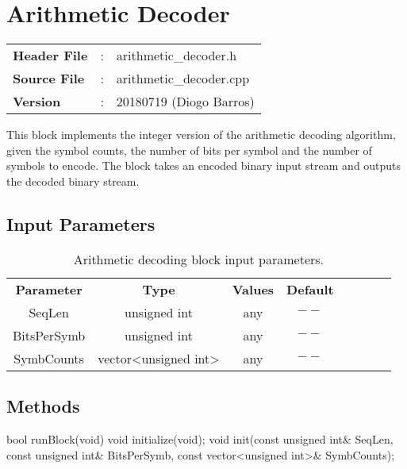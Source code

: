 \clearpage

\section{Arithmetic Decoder}

\begin{tcolorbox}	
	\begin{tabular}{p{2.75cm} p{0.2cm} p{10.5cm}} 	
		\textbf{Header File}   &:& arithmetic\_decoder.h \\
		\textbf{Source File}   &:& arithmetic\_decoder.cpp \\
        \textbf{Version}       &:& 20180719 (Diogo Barros) \\
	\end{tabular}
\end{tcolorbox}

This block implements the integer version of the arithmetic decoding algorithm, given the symbol counts, the number of bits per symbol and the number of symbols to encode.
The block takes an encoded binary input stream and outputs the decoded binary stream.

\subsection*{Input Parameters}

\begin{table}[h]
	\centering
	\begin{tabular}{|c|c|c|c|cccc}
	\cline{1-4}
	\textbf{Parameter} & \textbf{Type} & \textbf{Values} & \textbf{Default} & \\ \cline{1-5}
	SeqLen 	   & unsigned int 		  & any & $--$ 	\\ \cline{1-5}
	BitsPerSymb& unsigned int         & any & $--$ 	\\ \cline{1-5}	
	SymbCounts & vector<unsigned int> & any & $--$  \\ \cline{1-5}	
	\end{tabular}
	\caption{Arithmetic decoding block input parameters.}
	\label{table:arith_dec_in_par}
\end{table}

\subsection*{Methods}

bool runBlock(void)
\bigbreak
void initialize(void);
\bigbreak
void init(const unsigned int\& SeqLen, const unsigned int\& BitsPerSymb,
const vector<unsigned int>\& SymbCounts);
\bigbreak

